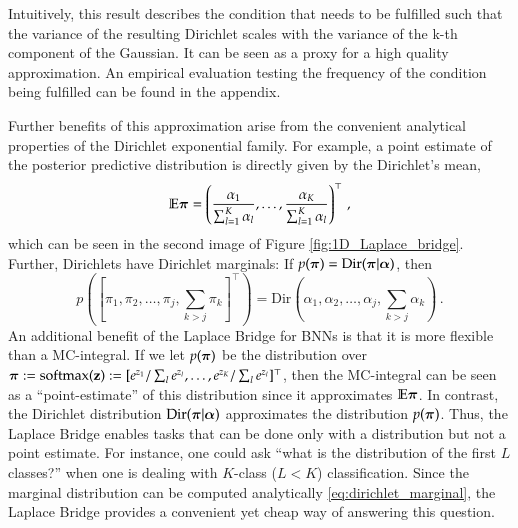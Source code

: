 Intuitively, this result describes the condition that needs to be fulfilled such that the variance of the resulting Dirichlet scales with the variance of the k-th component of the Gaussian. It can be seen as a proxy for a high quality approximation. An empirical evaluation testing the frequency of the condition being fulfilled can be found in the appendix.

Further benefits of this approximation arise from the convenient analytical properties of the Dirichlet exponential family. For example, a point estimate of the posterior predictive distribution is directly given by the Dirichlet's mean,
%
\begin{equation}\label{eq:dirichlet_mean}
    \mathbb{E}\boldsymbol{\pi} = \left( \frac{\alpha_1}{\sum_{l=1}^K \alpha_l}, \dots, \frac{\alpha_K}{\sum_{l=1}^K \alpha_l} \right)^\top \, ,
\end{equation}
%
which can be seen in the second image of Figure \ref{fig:1D_Laplace_bridge}. Further, Dirichlets have Dirichlet marginals: If $p(\boldsymbol{\pi}) = \mathrm{Dir}(\boldsymbol{\pi} | {\boldsymbol{\alpha}})$, then
\begin{equation} \label{eq:dirichlet_marginal}
     p([\pi_1,\pi_2,\dots,\pi_j,\sum_{k>j}\pi_k]^\top) = \mathrm{Dir}(\alpha_1,\alpha_2,\dots,\alpha_j,\sum_{k>j}\alpha_k) \, .
\end{equation}
An additional benefit of the Laplace Bridge for BNNs is that it is more flexible than a MC-integral. If we let $p(\boldsymbol{\pi})$ be the distribution over $\boldsymbol{\pi} := \mathrm{softmax}(\mathbf{z}) := [e^{z_1}/\sum_{l} e^{z_l}, \dots, e^{z_K}/\sum_{l} e^{z_l}]^\top$, then the MC-integral can be seen as a ``point-estimate'' of this distribution since it approximates $\mathbb{E}\boldsymbol{\pi}$. In contrast, the Dirichlet distribution $\mathrm{Dir}(\boldsymbol{\pi} | {\boldsymbol{\alpha}})$ approximates the distribution $p(\boldsymbol{\pi})$. Thus, the Laplace Bridge enables tasks that can be done only with a distribution but not a point estimate. For instance, one could ask ``what is the distribution of the first $L$ classes?'' when one is dealing with $K$-class ($L < K$) classification. Since the marginal distribution can be computed analytically \eqref{eq:dirichlet_marginal}, the Laplace Bridge provides a convenient yet cheap way of answering this question.
